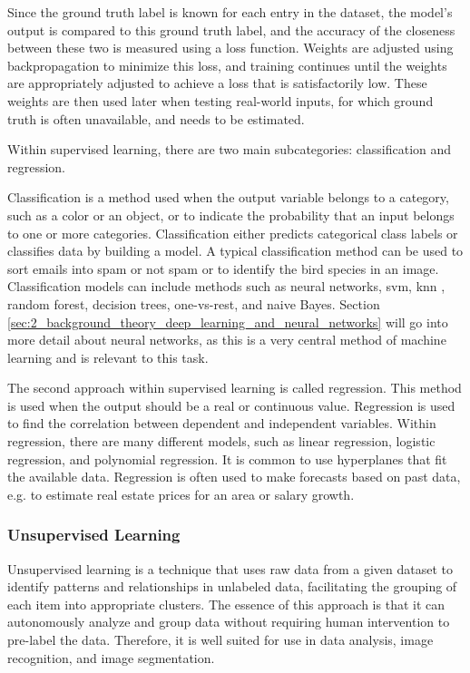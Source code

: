         Since the ground truth label is known for each entry in the dataset, the model's output is compared to this ground truth label, and the accuracy of the closeness between these two is measured using a loss function. Weights are adjusted using backpropagation to minimize this loss, and training continues until the weights are appropriately adjusted to achieve a loss that is satisfactorily low. These weights are then used later when testing real-world inputs, for which ground truth is often unavailable, and needs to be estimated.
        
        Within supervised learning, there are two main subcategories: classification and regression. 
        
        Classification is a method used when the output variable belongs to a category, such as a color or an object, or to indicate the probability that an input belongs to one or more categories. Classification either predicts categorical class labels or classifies data by building a model. A typical classification method can be used to sort emails into spam or not spam or to identify the bird species in an image. Classification models can include methods such as neural networks, \gls{svm}, \gls{knn} \cite{fixDiscriminatoryAnalysisNonparametric1989, coverNearestNeighborPattern1967}, random forest, decision trees, one-vs-rest, and naive Bayes. Section \ref{sec:2_background_theory_deep_learning_and_neural_networks} will go into more detail about neural networks, as this is a very central method of machine learning and is relevant to this task.
        
        The second approach within supervised learning is called regression. This method is used when the output should be a real or continuous value. Regression is used to find the correlation between dependent and independent variables. Within regression, there are many different models, such as linear regression, logistic regression, and polynomial regression. It is common to use hyperplanes that fit the available data. Regression is often used to make forecasts based on past data, e.g. to estimate real estate prices for an area or salary growth.


        \subsubsection{Unsupervised Learning}

        Unsupervised learning is a technique that uses raw data from a given dataset to identify patterns and relationships in unlabeled data, facilitating the grouping of each item into appropriate clusters. The essence of this approach is that it can autonomously analyze and group data without requiring human intervention to pre-label the data. Therefore, it is well suited for use in data analysis, image recognition, and image segmentation.
        
